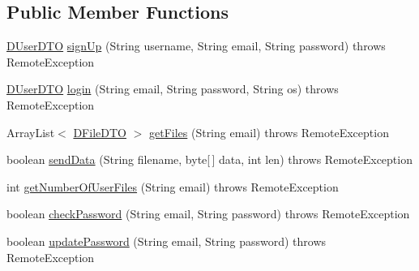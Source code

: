 \subsection*{Public Member Functions}
\begin{DoxyCompactItemize}
\item 
\mbox{\hyperlink{classes_1_1deusto_1_1bspq18_1_1e6_1_1_deusto_box_1_1_server_1_1dto_1_1_d_user_d_t_o}{D\+User\+D\+TO}} \mbox{\hyperlink{interfacees_1_1deusto_1_1bspq18_1_1e6_1_1_deusto_box_1_1_server_1_1remote_1_1_i_deusto_box_remote_service_ab3adf6a3ab12372cf306b30b3fd98636}{sign\+Up}} (String username, String email, String password)  throws Remote\+Exception
\item 
\mbox{\hyperlink{classes_1_1deusto_1_1bspq18_1_1e6_1_1_deusto_box_1_1_server_1_1dto_1_1_d_user_d_t_o}{D\+User\+D\+TO}} \mbox{\hyperlink{interfacees_1_1deusto_1_1bspq18_1_1e6_1_1_deusto_box_1_1_server_1_1remote_1_1_i_deusto_box_remote_service_a1d595efe4735a4977ec4d5d5e2f29bee}{login}} (String email, String password, String os)  throws Remote\+Exception
\item 
Array\+List$<$ \mbox{\hyperlink{classes_1_1deusto_1_1bspq18_1_1e6_1_1_deusto_box_1_1_server_1_1dto_1_1_d_file_d_t_o}{D\+File\+D\+TO}} $>$ \mbox{\hyperlink{interfacees_1_1deusto_1_1bspq18_1_1e6_1_1_deusto_box_1_1_server_1_1remote_1_1_i_deusto_box_remote_service_a53d2f238c6a092b1f873cd40a70a830d}{get\+Files}} (String email)  throws Remote\+Exception
\item 
boolean \mbox{\hyperlink{interfacees_1_1deusto_1_1bspq18_1_1e6_1_1_deusto_box_1_1_server_1_1remote_1_1_i_deusto_box_remote_service_a0c8761f7c34f0424f972c1801db6bfc6}{send\+Data}} (String filename, byte\mbox{[}$\,$\mbox{]} data, int len)  throws Remote\+Exception
\item 
int \mbox{\hyperlink{interfacees_1_1deusto_1_1bspq18_1_1e6_1_1_deusto_box_1_1_server_1_1remote_1_1_i_deusto_box_remote_service_a80dac713a05e2f7ef7b8e8ac4aa4b13d}{get\+Number\+Of\+User\+Files}} (String email)  throws Remote\+Exception
\item 
boolean \mbox{\hyperlink{interfacees_1_1deusto_1_1bspq18_1_1e6_1_1_deusto_box_1_1_server_1_1remote_1_1_i_deusto_box_remote_service_ade1f67d916a6ad0e9d256aa60c80a8a7}{check\+Password}} (String email, String password)  throws Remote\+Exception
\item 
boolean \mbox{\hyperlink{interfacees_1_1deusto_1_1bspq18_1_1e6_1_1_deusto_box_1_1_server_1_1remote_1_1_i_deusto_box_remote_service_aa73e5a3a839d93e49a0f0005e54e3e07}{update\+Password}} (String email, String password)  throws Remote\+Exception

\end{DoxyCompactItemize}
